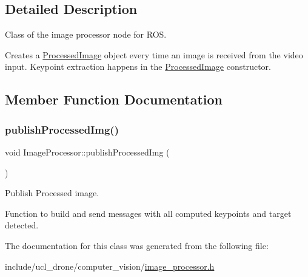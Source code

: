 \subsection{Detailed Description}
Class of the image processor node for R\+OS. 

Creates a \hyperlink{classProcessedImage}{Processed\+Image} object every time an image is received from the video input. Keypoint extraction happens in the \hyperlink{classProcessedImage}{Processed\+Image} constructor. 

\subsection{Member Function Documentation}
\mbox{\label{classImageProcessor_ac46ce7c70848213b2221fb46f1b58f45}} 
\subsubsection{\texorpdfstring{publish\+Processed\+Img()}{publishProcessedImg()}}
{\footnotesize\ttfamily void Image\+Processor\+::publish\+Processed\+Img (\begin{DoxyParamCaption}{ }\end{DoxyParamCaption})}



Publish Processed image. 

Function to build and send messages with all computed keypoints and target detected. 

The documentation for this class was generated from the following file\+:\begin{DoxyCompactItemize}
\item 
include/ucl\+\_\+drone/computer\+\_\+vision/\hyperlink{image__processor_8h}{image\+\_\+processor.\+h}\end{DoxyCompactItemize}
